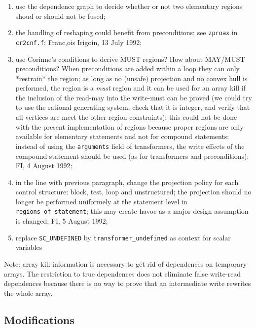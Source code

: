 \begin{enumerate}

  \item use the dependence graph to decide whether or not two elementary
	regions shoud or should not be fused;

  \item the handling of reshaping could benefit from preconditions;
	see \verb+zproax+ in \verb+cr2cnf.f+; Franc,ois Irigoin,
	13 July 1992;

  \item use {Corinne}'s conditions to derive MUST regions? How about MAY/MUST
	preconditions? When preconditions are added within a loop they
	can only *restrain* the region; as long as no (unsafe) projection
	and no convex hull is performed, the region is a {\em must} region
	and it can be used for an array kill if the inclusion of the
	read-may into the write-must can be proved (we could try to use
	the rational generating system, check that it is integer, and
	verify that all vertices are meet the other region constraints);
	this could not be done with the present implementation of regions
	because proper regions are only available for elementary statements
	and not for compound statements; instead of using the \verb+arguments+
	field of transformers, the write effects of the compound statement
	should be used (as for transformers and preconditions);
	FI, 4 August 1992;

  \item in the line with previous paragraph, change the projection
	policy for each control structure: block, test, loop and
	unstructured; the projection should no longer be performed
	uniformely at the statement level in \verb+regions_of_statement+;
	this may create havoc as a major design assumption is changed;
	FI, 5 August 1992;

  \item replace \verb+SC_UNDEFINED+ by \verb+transformer_undefined+
	as context for scalar variables

\end{enumerate}

Note: array kill information is necessary to get rid of dependences on
temporary arrays. The restriction to true dependences does not eliminate
false write-read dependences because there is no way to prove that an
intermediate write rewrites the whole array.

\subsection{Modifications}

